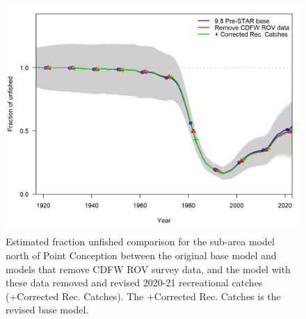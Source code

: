 \documentclass[
  letterpaper,
]{article}
\begin{document}
\pagebreak

\begin{figure}
\centering
\includegraphics[width=1\textwidth,height=1\textheight]{9.10_corrected_base_compare4_Bratio_uncertainty.png}
\caption{Estimated fraction unfished comparison for the sub-area model north of Point Conception between the original base model and models that remove CDFW ROV survey data, and the model with these data removed and revised 2020-21 recreational catches (+Corrected Rec. Catches). The +Corrected Rec. Catches is the revised base model.\label{fig:north-depl}}
\end{figure}

\pagebreak
\end{document}
